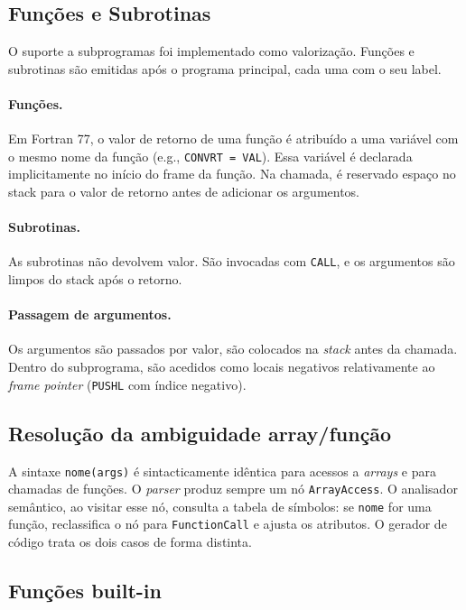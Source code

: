 \documentclass[11pt, a4paper, fleqn]{article}
\begin{document}
\subsection{Funções e Subrotinas}

O suporte a subprogramas foi implementado como valorização. Funções e subrotinas são emitidas após o programa principal, cada uma com o seu label.

\paragraph{Funções.}
Em Fortran 77, o valor de retorno de uma função é atribuído a uma variável com o mesmo nome da função (e.g., \texttt{CONVRT = VAL}). Essa variável é declarada implicitamente no início do frame da função. Na chamada, é reservado espaço no stack para o valor de retorno antes de adicionar os argumentos.

\paragraph{Subrotinas.}
As subrotinas não devolvem valor. São invocadas com \texttt{CALL}, e os argumentos são limpos do stack após o retorno.

\paragraph{Passagem de argumentos.}
Os argumentos são passados por valor, são colocados na \textit{stack} antes da chamada. Dentro do subprograma, são acedidos como locais negativos relativamente ao \textit{frame pointer} (\texttt{PUSHL} com índice negativo).

\subsection{Resolução da ambiguidade array/função}

A sintaxe \texttt{nome(args)} é sintacticamente idêntica para acessos a \textit{arrays} e para chamadas de funções. O \textit{parser} produz sempre um nó \texttt{ArrayAccess}. O analisador semântico, ao visitar esse nó, consulta a tabela de símbolos: se \texttt{nome} for uma função, reclassifica o nó para \texttt{FunctionCall} e ajusta os atributos. O gerador de código trata os dois casos de forma distinta.

\subsection{Funções built-in}
\end{document}
